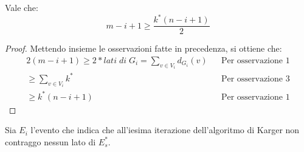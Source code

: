 \begin{lemma}
    \label{lkarg}
    Vale che:
    $$m-i+1 \geq \frac{k^*(n-i+1)}{2}$$
\end{lemma}
\begin{proof}
    Mettendo insieme le osservazioni fatte in precedenza, si ottiene che:
    \begin{equation}
        \begin{aligned}
            2(m - i + 1 ) \geq 2 * \mathit{lati\;di\;G_i} = \sum_{v \in V_i} d_{G_i}(v) && \text{Per osservazione 1}\\
            \geq \sum_{v \in V_i} k^* && \text{Per osservazione 3}\\
            \geq k^*(n-i+1) && \text{Per osservazione 1}
        \end{aligned}
    \end{equation}
\end{proof}

Sia $E_i$ l'evento che indica che all'iesima iterazione dell'algoritmo di Karger non contraggo nessun lato 
di $E_s^*$.


